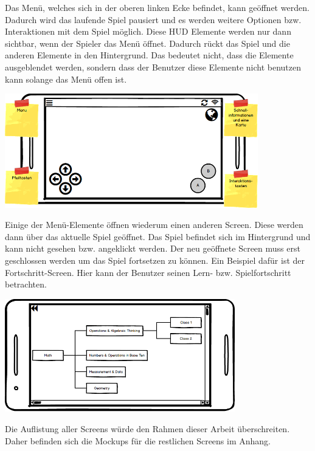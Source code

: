 			Das Menü, welches sich in der oberen linken Ecke befindet, kann geöffnet werden. Dadurch wird das laufende Spiel pausiert und es werden weitere Optionen bzw. Interaktionen mit dem Spiel möglich. Diese HUD Elemente werden nur dann sichtbar, wenn der Spieler das Menü öffnet. Dadurch rückt das Spiel und die anderen Elemente in den Hintergrund. Das bedeutet nicht, dass die Elemente ausgeblendet werden, sondern dass der Benutzer diese Elemente nicht benutzen kann solange das Menü offen ist.
			
			\begin{center}
				\includegraphics[width=11cm]{pics/HUD_Mockup.png}
			\end{center}
			
			Einige der Menü-Elemente öffnen wiederum einen anderen Screen. Diese werden dann über das aktuelle Spiel geöffnet. Das Spiel befindet sich im Hintergrund und kann nicht gesehen bzw. angeklickt werden. Der neu geöffnete Screen muss erst geschlossen werden um das Spiel fortsetzen zu können. Ein Beispiel dafür ist der Fortschritt-Screen. Hier kann der Benutzer seinen Lern- bzw. Spielfortschritt betrachten.
			
			\begin{center}
				\includegraphics[width=10cm]{pics/Fortschritt_Mockup.png}
			\end{center}
			
			Die Auflistung aller Screens würde den Rahmen dieser Arbeit überschreiten. Daher befinden sich die Mockups für die restlichen Screens im Anhang.
						
